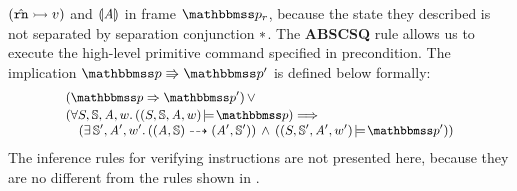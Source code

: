 $({\hat{\texttt{rn}}} \rightarrowtail {v})$ and $\llparenthesis {\textit{A}} \rrparenthesis$
in frame $\relastP_r$,
because the state they described is not separated by
separation conjunction $*$.
The \textbf{ABSCSQ} rule allows us to execute the high-level
primitive command specified in precondition.
The implication $\absExec{\relastP}{\relastP'}$
is defined below formally:
\[
    \small
    \begin{array}{l}
        (\relastP \Rightarrow \relastP') \, \lor \\
        \\[-9.5pt]
        (
            \forall \state, \hpstate, \primcom, \word. \,
            (\asrtmodel{(\state, \hpstate, \primcom, \word)}
                {\relastP}) \Longrightarrow \\
            \quad
            (\exists \, \hpstate', \primcom', \word'. \,
            (\primTrans{(\primcom, \hpstate)}
        	{(\primcom', \hpstate')})
            \, \land \,
            (\asrtmodel{(\state, \hpstate', \primcom', \word')}{\relastP'}))
    \end{array}
\]
The inference rules for verifying instructions are not
presented here, because they are no different from
the rules shown in \Fig{\ref{fig:Seleted Inference rules}}.

